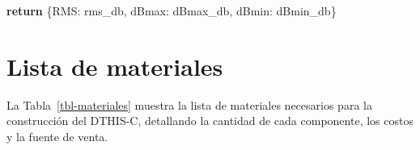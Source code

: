 \documentclass[
  letterpaper,
]{scrbook}
\newenvironment{Shaded}{\begin{snugshade}}{\end{snugshade}}
\newcommand{\ControlFlowTok}[1]{\textcolor[rgb]{0.00,0.23,0.31}{\textbf{#1}}}
\newcommand{\NormalTok}[1]{\textcolor[rgb]{0.00,0.23,0.31}{#1}}
\newcommand{\StringTok}[1]{\textcolor[rgb]{0.13,0.47,0.30}{#1}}
\begin{document}
\begin{Shaded}
\begin{Highlighting}[]
    \ControlFlowTok{return}\NormalTok{ \{}\StringTok{\textquotesingle{}RMS\textquotesingle{}}\NormalTok{: rms\_db, }\StringTok{\textquotesingle{}dBmax\textquotesingle{}}\NormalTok{: dBmax\_db, }\StringTok{\textquotesingle{}dBmin\textquotesingle{}}\NormalTok{: dBmin\_db\}}
\end{Highlighting}
\end{Shaded}

\section{Lista de materiales}\label{lista-de-materiales}

La Tabla~\ref{tbl-materiales} muestra la lista de materiales necesarios
para la construcción del DTHIS-C, detallando la cantidad de cada
componente, los costos y la fuente de venta.
\end{document}
